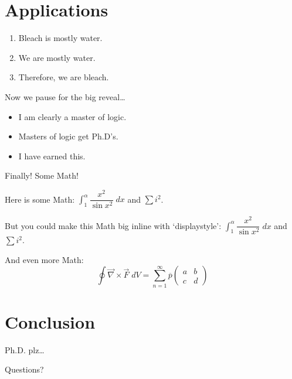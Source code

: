 \documentclass[10pt,dvipsnames]{beamer}
\theoremstyle{plain}
\theoremstyle{definition}
\theoremstyle{remark}
\numberwithin{equation}{section}
\newcommand{\ds}{\displaystyle}
\newcommand{\ov}[1]{\overline{#1}}
\newcommand{\twomatrix}[4]{\begin{pmatrix} #1 & #2 \\ #3 & #4 \end{pmatrix}}
\begin{document}
\section{Applications}



\begin{frame}
	\begin{enumerate}[1.]
	\item Bleach is mostly water. \pause
	\item We are mostly water. \pause
	\item Therefore, we are bleach.
	\end{enumerate} \vspace{0.5cm}

Now we pause for the big reveal\dots \pause \vspace{0.3cm}

	\begin{itemize}
	\item I am clearly a master of logic.
	\item Masters of logic get Ph.D's.
	\item I have earned this.
	\end{itemize}
\end{frame}



\begin{frame}
Finally! Some Math! \vspace{1cm}

Here is some Math: $\int_1^\alpha \dfrac{x^2}{\sin x^2} \;dx$ and $\sum i^2$. \vspace{1cm}

But you could make this Math big inline with `displaystyle': $\ds \int_1^\alpha \dfrac{x^2}{\sin x^2} \;dx$ and $\ds \sum i^2$. \vspace{1cm}

And even more Math:
	\[
	\oint \vec{\nabla} \times \vec{F} \;dV = \sum_{n=1}^\infty \ov{p} \twomatrix{a}{b}{c}{d}
	\]
\end{frame}



\section{Conclusion}



\begin{frame}
Ph.D. plz\dots
\end{frame}



{
\begin{frame}[standout]
  Questions?
\end{frame}
}
\end{document}
